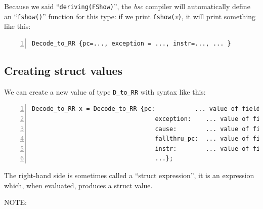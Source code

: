 \vspace{2ex}


Because we said ``\verb|deriving(FShow)|'', the \emph{bsc} compiler
will automatically define an ``\verb|fshow()|'' function for this
type: if we print \verb|fshow(|\emph{v}\verb|)|, it will print
something like this:

{\footnotesize
\begin{Verbatim}[frame=single, numbers=left]
Decode_to_RR {pc=..., exception = ..., instr=..., ... }
\end{Verbatim}
}


\subsection{Creating struct values}


We can create a new value of type \verb|D_to_RR| with syntax like
this:

{\footnotesize
\begin{Verbatim}[frame=single, numbers=left]
   Decode_to_RR x = Decode_to_RR {pc:           ... value of field ... ,
                                  exception:    ... value of field ... ,
                                  cause:        ... value of field ... ,
                                  fallthru_pc:  ... value of field ... ,
                                  instr:        ... value of field ... ,
                                  ...};
\end{Verbatim}
}

The right-hand side is sometimes called a ``struct expression'', {\ie}
it is an expression which, when evaluated, produces a struct value.

\vspace{2ex}

NOTE: 

